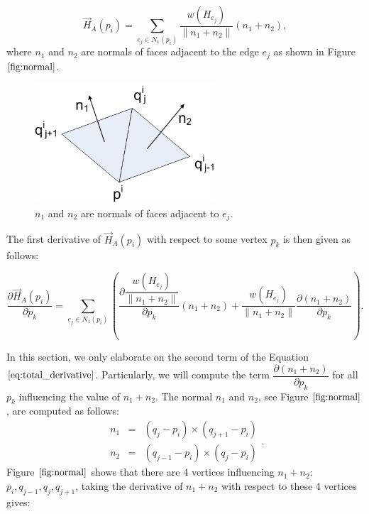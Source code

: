 \documentclass[11pt]{article}
\begin{document}
\begin{appendices}
\begin{equation}
\vec{H}_A(p_i) = \sum\limits_{e_j \in N_1(p_i)}\dfrac{w(H_{e_j})}{\parallel n_1+n_2 \parallel}(n_1 + n_2),
\end{equation}
where $n_1$ and $n_2$ are normals of faces adjacent to the edge $e_j$ as shown in Figure $\ref{fig:normal}$.
\begin{figure}[htbp]
\centering
\includegraphics[width=0.6\textwidth]{edge_normal.png}
\caption{$n_1$ and $n_2$ are normals of faces adjacent to $e_j$.}
\label{fig:normal}
\end{figure}
The first derivative of $\vec{H}_A(p_i)$ with respect to some vertex $p_k$ is then given as follows:

\begin{equation}
\dfrac{\partial \vec{H}_A(p_i)}{\partial p_k} = \sum\limits_{e_j \in N_1(p_i)} \left( \dfrac{\partial \dfrac{w(H_{e_j})}{\parallel n_1+n_2 \parallel}}{\partial p_k}(n_1+n_2) + \dfrac{w(H_{e_j})}{\parallel n_1+n_2 \parallel} \dfrac{\partial (n_1+n_2)}{\partial p_k} \right) .
\label{eq:total_derivative}
\end{equation}

In this section, we only elaborate on the second term of the Equation $\ref{eq:total_derivative}$. Particularly, we will compute the term $\dfrac{\partial (n_1+n_2)}{\partial p_k}$ for all $p_k$ influencing the value of $n_1+n_2$. The normal $n_1$ and $n_2$, see Figure $\ref{fig:normal}$, are computed as follows:
\begin{equation}
\begin{array}{rcl} 
n_1 & = & (q_j - p_i) \times (q_{j+1} - p_i) \\ 
n_2 & = & (q_{j-1} - p_i) \times (q_j - p_i) 
\end{array} .
\end{equation}
Figure $\ref{fig:normal}$ shows that there are 4 vertices influencing $n_1+n_2$: $p_i, q_{j-1}, q_j, q_{j+1}$, taking the derivative of $n_1+n_2$ with respect to these 4 vertices gives:


\end{appendices}
\end{document}
